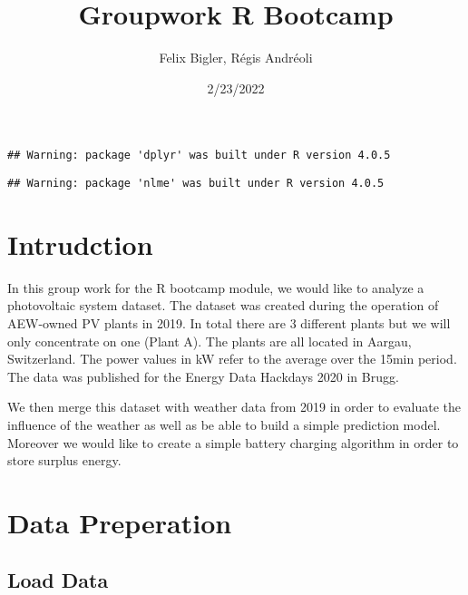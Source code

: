 \documentclass[
]{article}
\title{Groupwork R Bootcamp}
\author{Felix Bigler, Régis Andréoli}
\date{2/23/2022}
\newenvironment{Shaded}{\begin{snugshade}}{\end{snugshade}}
\newcommand{\AttributeTok}[1]{\textcolor[rgb]{0.77,0.63,0.00}{#1}}
\newcommand{\CommentTok}[1]{\textcolor[rgb]{0.56,0.35,0.01}{\textit{#1}}}
\newcommand{\ConstantTok}[1]{\textcolor[rgb]{0.00,0.00,0.00}{#1}}
\newcommand{\FunctionTok}[1]{\textcolor[rgb]{0.00,0.00,0.00}{#1}}
\newcommand{\NormalTok}[1]{#1}
\newcommand{\OtherTok}[1]{\textcolor[rgb]{0.56,0.35,0.01}{#1}}
\newcommand{\SpecialCharTok}[1]{\textcolor[rgb]{0.00,0.00,0.00}{#1}}
\newcommand{\StringTok}[1]{\textcolor[rgb]{0.31,0.60,0.02}{#1}}
\begin{document}
\maketitle

{
\setcounter{tocdepth}{4}
\tableofcontents
}
\begin{verbatim}
## Warning: package 'dplyr' was built under R version 4.0.5
\end{verbatim}

\begin{verbatim}
## Warning: package 'nlme' was built under R version 4.0.5
\end{verbatim}

\newpage

\hypertarget{intrudction}{%
\section{Intrudction}\label{intrudction}}

In this group work for the R bootcamp module, we would like to analyze a
photovoltaic system dataset. The dataset was created during the
operation of AEW-owned PV plants in 2019. In total there are 3 different
plants but we will only concentrate on one (Plant A). The plants are all
located in Aargau, Switzerland. The power values in kW refer to the
average over the 15min period. The data was published for the Energy
Data Hackdays 2020 in Brugg.

We then merge this dataset with weather data from 2019 in order to
evaluate the influence of the weather as well as be able to build a
simple prediction model. Moreover we would like to create a simple
battery charging algorithm in order to store surplus energy.

\hypertarget{data-preperation}{%
\section{Data Preperation}\label{data-preperation}}

\hypertarget{load-data}{%
\subsection{Load Data}\label{load-data}}

\begin{Shaded}
\end{Shaded}
\end{document}
